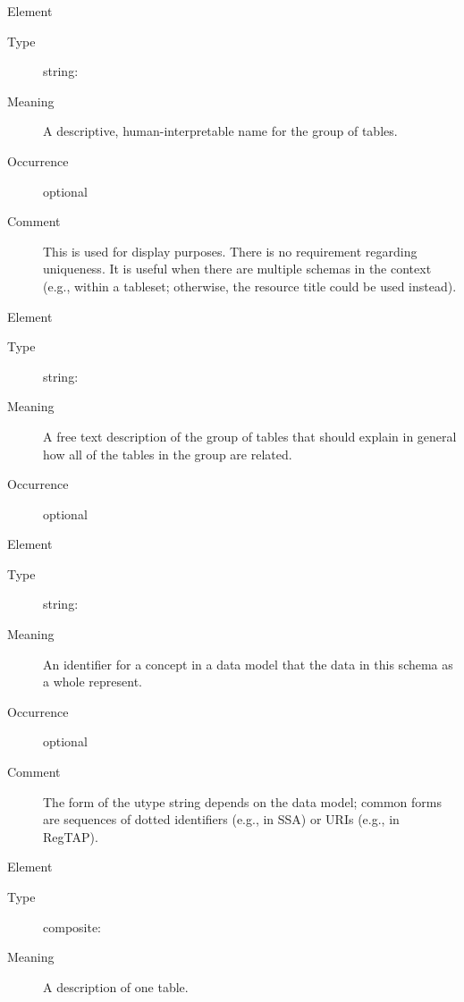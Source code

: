 \documentclass[11pt,a4paper]{ivoa}
\begin{document}
\begin{generated}
\begin{bigdescription}
\begin{description}
\end{description}
\item[Element \xmlel{title}]
\begin{description}
\item[Type] string: 
\item[Meaning] 
                  A descriptive, human-interpretable name for the group of 
                  tables.
               
\item[Occurrence] optional
\item[Comment] 
                  This is used for display purposes.  There is no requirement
                  regarding uniqueness.  It is useful when there are
                  multiple schemas in the context (e.g., within a
                  tableset; otherwise, the resource title could be
                  used instead).
               

\end{description}
\item[Element \xmlel{description}]
\begin{description}
\item[Type] string: 
\item[Meaning] 
               A free text description of the group of tables that should
               explain in general how all of the tables in the group are 
               related.
             
\item[Occurrence] optional

\end{description}
\item[Element \xmlel{utype}]
\begin{description}
\item[Type] string: 
\item[Meaning] 
                  An identifier for a concept in a data model that
                  the data in this schema as a whole represent.  
               
\item[Occurrence] optional
\item[Comment] 
                  The form of the utype string depends on the data
                  model; common forms are sequences of dotted identifiers
                  (e.g., in SSA) or URIs (e.g., in RegTAP).
               

\end{description}
\item[Element \xmlel{table}]
\begin{description}
\item[Type] composite: 
\item[Meaning] 
               A description of one table.
             

\end{description}
\end{bigdescription}
\end{generated}
\end{document}
